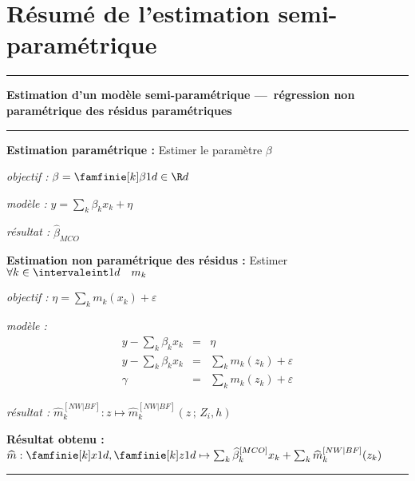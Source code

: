 \chapter{Résumé de l'estimation semi-paramétrique}\label{annexe:resume-estimation-semi-parametrique}



\noindent\rule[1pt]{\linewidth}{0.02cm}

\noindent\textbf{Estimation d'un modèle semi-paramétrique — régression non paramétrique des résidus paramétriques}

\noindent\rule[1pt]{\linewidth}{0.02cm}
\begin{circledenum}
    \item \textbf{Estimation paramétrique :} Estimer le paramètre $\beta$ 
        \begin{todolist}
            \item \emph{objectif :} $\beta = \famfinie[k] \beta 1 d \in \R d$
            \item \emph{modèle :} $y = \sum_k \beta_k x_k + \eta$
            \item \emph{résultat :} $\widehat \beta_{MCO}$
        \end{todolist}
    \item \textbf{Estimation non paramétrique des résidus :} Estimer $\forall k \in \intervaleint 1 d \quad m_k$
        \begin{todolist}
            \item \emph{objectif :} $\eta = \sum_k m_k(x_k) + \varepsilon$
            \item \emph{modèle :} 
            \begin{equation*}
                \begin{array}{rcl}
                    y - \sum_k \beta_k x_k &=& \eta
                    \\
                    y - \sum_k \beta_k x_k &=& \sum_k m_k(z_k) + \varepsilon
                    \\
                    \gamma &=& \sum_k m_k(z_k) + \varepsilon
                \end{array}
            \end{equation*}

            \item \emph{résultat :} $\widehat m_k^{[NW | BF]} : z \mapsto \widehat m_k^{[NW | BF]}(z \, ; \, Z_i, h )$
        \end{todolist}
    \item \textbf{Résultat obtenu : } $\widehat m : \famfinie[k] x 1 d , \famfinie[k] z 1 d \mapsto \sum_k \widehat \beta_k^{[MCO]} x_k + \sum_k \widehat m_k^{[NW | BF]}(z_k)$
\end{circledenum}
\noindent\rule[1pt]{\linewidth}{0.02cm}

